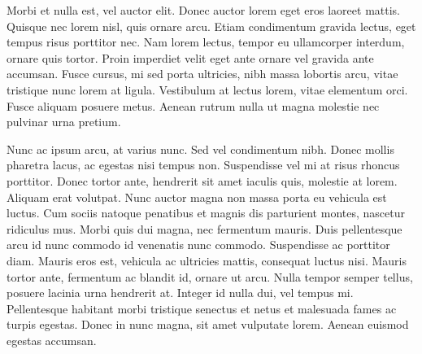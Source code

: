 Morbi et nulla est, vel auctor elit. Donec auctor lorem eget eros laoreet mattis. Quisque nec lorem nisl, quis ornare arcu. Etiam condimentum gravida lectus, eget tempus risus porttitor nec. Nam lorem lectus, tempor eu ullamcorper interdum, ornare quis tortor. Proin imperdiet velit eget ante ornare vel gravida ante accumsan. Fusce cursus, mi sed porta ultricies, nibh massa lobortis arcu, vitae tristique nunc lorem at ligula. Vestibulum at lectus lorem, vitae elementum orci. Fusce aliquam posuere metus. Aenean rutrum nulla ut magna molestie nec pulvinar urna pretium.

Nunc ac ipsum arcu, at varius nunc. Sed vel condimentum nibh. Donec mollis pharetra lacus, ac egestas nisi tempus non. Suspendisse vel mi at risus rhoncus porttitor. Donec tortor ante, hendrerit sit amet iaculis quis, molestie at lorem. Aliquam erat volutpat. Nunc auctor magna non massa porta eu vehicula est luctus. Cum sociis natoque penatibus et magnis dis parturient montes, nascetur ridiculus mus. Morbi quis dui magna, nec fermentum mauris. Duis pellentesque arcu id nunc commodo id venenatis nunc commodo. Suspendisse ac porttitor diam. Mauris eros est, vehicula ac ultricies mattis, consequat luctus nisi. Mauris tortor ante, fermentum ac blandit id, ornare ut arcu. Nulla tempor semper tellus, posuere lacinia urna hendrerit at. Integer id nulla dui, vel tempus mi. Pellentesque habitant morbi tristique senectus et netus et malesuada fames ac turpis egestas. Donec in nunc magna, sit amet vulputate lorem. Aenean euismod egestas accumsan. 